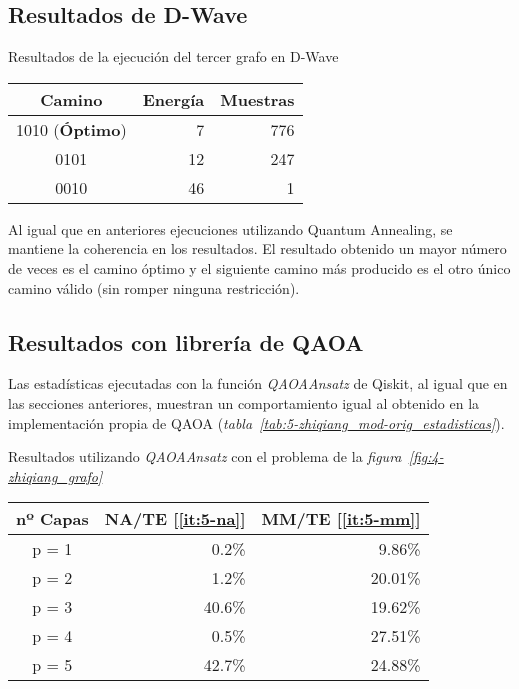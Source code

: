 \subsection{Resultados de D-Wave}
\begin{table}[htbp]{}{Resultados de la ejecución del tercer grafo en D-Wave}
  \centering
  \begin{tabular}{|c|r|r|}
    \hline
    \textbf{Camino}        & \textbf{Energía} & \textbf{Muestras} \\ \hline
    1010 (\textbf{Óptimo}) &  7               & 776               \\ \hline
    0101                   & 12               & 247               \\ \hline
    0010                   & 46               &   1               \\ \hline
  \end{tabular}
\end{table}

Al igual que en anteriores ejecuciones utilizando Quantum Annealing, se mantiene la coherencia en los resultados. El resultado obtenido un mayor número de veces es el camino óptimo y el siguiente camino más producido es el otro único camino válido (sin romper ninguna restricción).

\subsection{Resultados con librería de QAOA}

Las estadísticas ejecutadas con la función \textit{QAOAAnsatz} de Qiskit, al igual que en las secciones anteriores, muestran un comportamiento igual al obtenido en la implementación propia de QAOA (\textit{tabla~\ref{tab:5-zhiqiang_mod-orig_estadisticas}}).

\begin{table}[htbp]{}{Resultados utilizando \textit{QAOAAnsatz} con el problema de la \textit{figura~\ref{fig:4-zhiqiang_grafo}}}
  \centering
  \begin{tabular}{|c|r|r|}
    \hline
    \textbf{nº Capas} & \textbf{NA/TE} [\ref{it:5-na}] & \textbf{MM/TE} [\ref{it:5-mm}] \\ \hline
    p = 1 &  0.2\% &  9.86\% \\ \hline
    p = 2 &  1.2\% & 20.01\% \\ \hline
    p = 3 & 40.6\% & 19.62\% \\ \hline
    p = 4 &  0.5\% & 27.51\% \\ \hline
    p = 5 & 42.7\% & 24.88\% \\ \hline
  \end{tabular}
\end{table}


